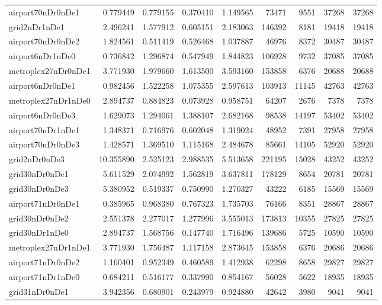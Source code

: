 \begin{longtable}{|l|r|r|r|r|r|r|r|r|}
airport70nDr0nDe1 & 0.779449 & 0.779155 & 0.370410 & 1.149565 & 73471 & 9551 & 37268 & 37268 \\
grid2nDr1nDe1 & 2.496241 & 1.577912 & 0.605151 & 2.183063 & 146392 & 8181 & 19418 & 19418 \\
airport70nDr0nDe2 & 1.824561 & 0.511419 & 0.526468 & 1.037887 & 46976 & 8372 & 30487 & 30487 \\
airport6nDr1nDe0 & 0.736842 & 1.296874 & 0.547949 & 1.844823 & 106928 & 9732 & 37085 & 37085 \\
metroplex27nDr0nDe1 & 3.771930 & 1.979660 & 1.613500 & 3.593160 & 153858 & 6376 & 20688 & 20688 \\
airport6nDr0nDe1 & 0.982456 & 1.522258 & 1.075355 & 2.597613 & 103913 & 11145 & 42763 & 42763 \\
metroplex27nDr1nDe0 & 2.894737 & 0.884823 & 0.073928 & 0.958751 & 64207 & 2676 & 7378 & 7378 \\
airport6nDr0nDe3 & 1.629073 & 1.294061 & 1.388107 & 2.682168 & 98538 & 14197 & 53402 & 53402 \\
airport70nDr1nDe1 & 1.348371 & 0.716976 & 0.602048 & 1.319024 & 48952 & 7391 & 27958 & 27958 \\
airport70nDr0nDe3 & 1.428571 & 1.369510 & 1.115168 & 2.484678 & 85661 & 14105 & 52920 & 52920 \\
grid2nDr0nDe3 & 10.355890 & 2.525123 & 2.988535 & 5.513658 & 221195 & 15028 & 43252 & 43252 \\
grid30nDr0nDe1 & 5.611529 & 2.074992 & 1.562819 & 3.637811 & 178129 & 8654 & 20781 & 20781 \\
grid30nDr0nDe3 & 5.380952 & 0.519337 & 0.750990 & 1.270327 & 43222 & 6185 & 15569 & 15569 \\
airport71nDr0nDe1 & 0.385965 & 0.968380 & 0.767323 & 1.735703 & 76166 & 8351 & 28867 & 28867 \\
grid30nDr0nDe2 & 2.551378 & 2.277017 & 1.277996 & 3.555013 & 173813 & 10355 & 27825 & 27825 \\
grid30nDr1nDe0 & 2.894737 & 1.568756 & 0.147740 & 1.716496 & 139686 & 5725 & 10590 & 10590 \\
metroplex27nDr1nDe1 & 3.771930 & 1.756487 & 1.117158 & 2.873645 & 153858 & 6376 & 20686 & 20686 \\
airport71nDr0nDe2 & 1.160401 & 0.952349 & 0.460589 & 1.412938 & 62298 & 8658 & 29827 & 29827 \\
airport71nDr1nDe0 & 0.684211 & 0.516177 & 0.337990 & 0.854167 & 56028 & 5622 & 18935 & 18935 \\
grid31nDr0nDe1 & 3.942356 & 0.680901 & 0.243979 & 0.924880 & 42642 & 3980 & 9041 & 9041 \\

\end{longtable}
